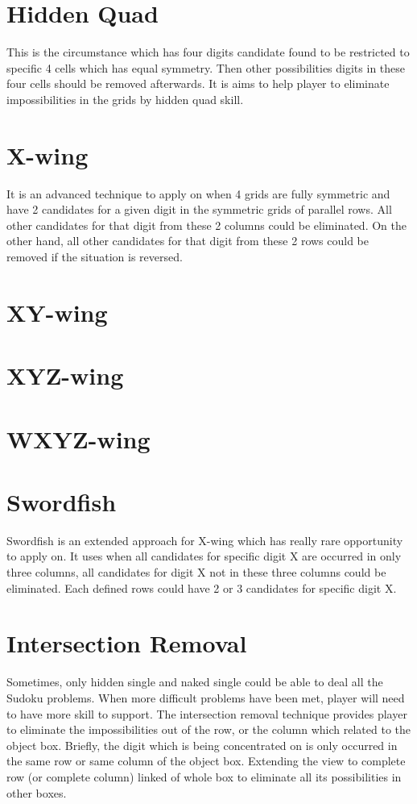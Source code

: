 \documentclass[11pt]{report}
\begin{document}
\section{Hidden Quad}
\label{sec:Hidden Quad}
This is the circumstance which has four digits candidate found to be restricted to specific 4 cells which has equal symmetry. Then other possibilities digits in these four cells should be removed afterwards. It is aims to help player to eliminate impossibilities in the grids by hidden quad skill. 

\section{X-wing}
\label{sec:X-wing}
It is an advanced technique to apply on when 4 grids are fully symmetric and have 2 candidates for a given digit in the symmetric grids of parallel rows. All other candidates for that digit from these 2 columns could be eliminated. On the other hand, all other candidates for that digit from these 2 rows could be removed if the situation is reversed.

\section{XY-wing}
\label{sec:XY-wing}

\section{XYZ-wing}
\label{sec:XYZ-wing}

\section{WXYZ-wing}
\label{sec:WXYZ-wing}

\section{Swordfish}
\label{sec:Swordfish}
Swordfish is an extended approach for X-wing which has really rare opportunity to apply on. It uses when all candidates for specific digit X are occurred in only three columns, all candidates for digit X not in these three columns could be eliminated. Each defined rows could have 2 or 3 candidates for specific digit X.

\section{Intersection Removal}
\label{sec:Intersection Removal}
Sometimes, only hidden single and naked single could be able to deal all the Sudoku problems. When more difficult problems have been met, player will need to have more skill to support.
The intersection removal technique provides player to eliminate the impossibilities out of the row, or the column which related to the object box.
Briefly, the digit which is being concentrated on is only occurred in the same row or same column of the object box. Extending the view to complete row (or complete column) linked of whole box to eliminate all its possibilities in other boxes.
\end{document}
